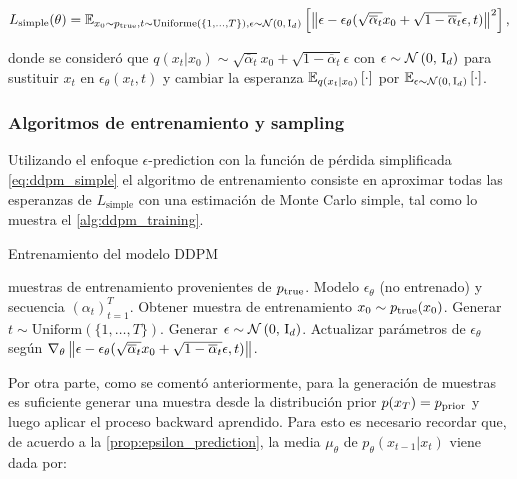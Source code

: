 \begin{equation}
    \label{eq:ddpm_simple}
    L_{\text{simple}}(\theta) = \mathbb{E}_{x_0\sim p_{\operatorname{true}},t\sim\operatorname{Uniforme}\left(\{1,\ldots,T\}\right),\epsilon\sim\mathcal{N}\left(0,\,\operatorname{I}_{d}\right)}\left[\left\lVert \epsilon-\epsilon_\theta(\sqrt{\overline{\alpha}_t}x_0+\sqrt{1-\overline{\alpha}_t}\epsilon,t) \right\rVert^2\right],
\end{equation}

donde se consideró que $q(x_t|x_0)\sim \sqrt{\overline{\alpha}_t}x_0 + \sqrt{1-\overline{\alpha}_t}\epsilon$ con $\epsilon\sim\mathcal{N}\left(0,\,\operatorname{I}_{d}\right)$ para sustituir $x_t$ en $\epsilon_\theta(x_t,t)$ y cambiar la esperanza $\mathbb{E}_{q(x_t|x_0)}\left[\cdot\right]$ por $\mathbb{E}_{\epsilon\sim\mathcal{N}\left(0,\,\operatorname{I}_{d}\right)}\left[\cdot\right]$.

\subsubsection{Algoritmos de entrenamiento y sampling}

Utilizando el enfoque $\epsilon$-prediction con la función de pérdida simplificada \eqref{eq:ddpm_simple} el algoritmo de entrenamiento consiste en aproximar todas las esperanzas de $L_\text{simple}$ con una estimación de Monte Carlo simple, tal como lo muestra el \autoref{alg:ddpm_training}.

\begin{algorithm}
    \caption{Entrenamiento del modelo DDPM}
    \label{alg:ddpm_training}
    \begin{algorithmic}[1]
        \Require muestras de entrenamiento provenientes de $p_{\operatorname{true}}$.
        \Require Modelo $\epsilon_\theta$ (no entrenado) y secuencia $(\alpha_t)_{t=1}^T$.
        \State Obtener muestra de entrenamiento $x_0\sim p_{\operatorname{true}}(x_0)$.
        \State Generar $t\sim\text{Uniform}\left(\{1,\ldots,T\}\right)$.
        \State Generar $\epsilon\sim\mathcal{N}\left(0,\,\operatorname{I}_{d}\right)$.
        \State Actualizar parámetros de $\epsilon_\theta$ según $\nabla_\theta \left\lVert \epsilon-\epsilon_\theta(\sqrt{\overline{\alpha}_t}x_0+\sqrt{1-\overline{\alpha}_t}\epsilon,t) \right\rVert$.
        \EndWhile
    \end{algorithmic}
\end{algorithm}

Por otra parte, como se comentó anteriormente, para la generación de muestras es suficiente generar una muestra desde la distribución prior $p(x_T)=p_{\operatorname{prior}}$ y luego aplicar el proceso backward aprendido. Para esto es necesario recordar que, de acuerdo a la \autoref{prop:epsilon_prediction}, la media $\mu_\theta$ de $p_\theta(x_{t-1}|x_t)$ viene dada por:

